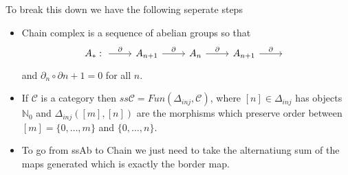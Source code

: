 \documentclass[11pt]{amsart}
\theoremstyle{definition}
\def\scriptc{{\mathcal C}}
\begin{document}
To break this down we have the following seperate steps
\begin{itemize}
	\item Chain complex is a sequence of abelian groups so that 
\begin{equation*}
\begin{tikzcd}
	A_* :\;\arrow{r}{\partial}&A_{n+1} \arrow{r}{\partial} & A_n \arrow{r}{\partial} & A_{n+1} \arrow{r}{\partial} & \;
\end{tikzcd}
\end{equation*}
and $\partial_n \circ \partial{n+1} = 0$ for all $n.$
\item If $\scriptc$ is a category then $ss\scriptc = Fun(\Delta_{inj}, \scriptc)$, where $[n] \in \Delta_{inj}$ has objects $\mathbb{N}_0$ and $\Delta_{inj}([m], [n])$ are the morphisms which preserve order between $[m] =\{0, \dots, m\}$ and $\{0, \dots, n\}$.  

\item To go from ssAb to Chain we just need to take the alternatiung sum of the maps generated which is exactly the border map.
\end{itemize}
\end{document}
